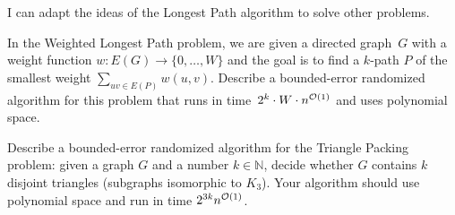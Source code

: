 \documentclass[english]{uebung_cs}
\begin{document}
\begin{skill}
  I can adapt the ideas of the Longest Path algorithm to solve other problems.
\end{skill}

\begin{exercise}
  In the Weighted Longest Path problem, we are given a directed graph~\( G \) with a weight function \( w\colon E(G) \to \{0, \ldots, W\} \) and the goal is to find a \( k \)-path \( P \) of the smallest weight \(\sum_{uv\in E(P)} w(u, v)\). Describe a bounded-error randomized algorithm for this problem that runs in time~\( 2^k \cdot W \cdot n^{\mathcal{O}(1)} \) and uses polynomial space.
\end{exercise}

\begin{exercise}
  Describe a bounded-error randomized algorithm for the Triangle Packing problem: given a graph \( G \) and a number \( k \in \mathbb{N} \), decide whether \( G \) contains \( k \) disjoint triangles (subgraphs isomorphic to \( K_3 \)).
  Your algorithm should use polynomial space and run in time \( 2^{3k} n^{\mathcal{O}(1)} \).
\end{exercise}
\end{document}
